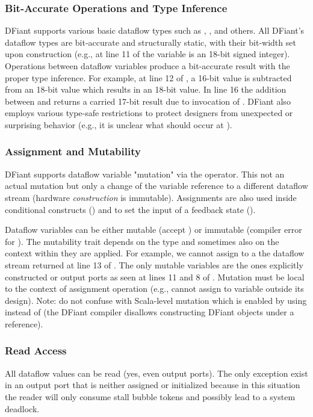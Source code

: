 \subsubsection{Bit-Accurate Operations and Type Inference}
DFiant supports various basic dataflow types such as , , and others.
All DFiant's dataflow types are bit-accurate and structurally static, with their bit-width set upon construction (e.g., at line 11 of  the variable  is an 18-bit signed integer). Operations between dataflow variables produce a bit-accurate result with the proper type inference. For example, at line 12 of , a 16-bit value is subtracted from an 18-bit value which results in an 18-bit value. In line 16 the addition between  and  returns a carried 17-bit result due to invocation of . DFiant also employs various type-safe restrictions to protect designers from unexpected or surprising behavior (e.g., it is unclear what should occur at ).

\subsubsection{Assignment and Mutability}
\label{sec:mutability}
DFiant supports dataflow variable "mutation" via the \code{:=} operator. This not an actual mutation but only a change of the variable reference to a different dataflow stream (hardware \emph{construction} is immutable). Assignments are also used inside conditional constructs () and to set the input of a feedback state ().

Dataflow variables can be either mutable (accept \code{:=}) or immutable (compiler error for \code{:=}). The mutability trait depends on the type and sometimes also on the context within they are applied. For example, we cannot assign to a the dataflow stream returned at line 13 of . The only mutable variables are the ones explicitly constructed or output ports as seen at lines 11 and 8 of . Mutation must be local to the context of assignment operation (e.g., cannot assign to variable outside its design).
Note: do not confuse with Scala-level mutation which is enabled by using  instead of  (the DFiant compiler disallows constructing DFiant objects under a  reference). 

\subsubsection{Read Access}
All dataflow values can be read (yes, even output ports). The only exception exist in an output port that is neither assigned or initialized because in this situation the reader will only consume stall bubble tokens and possibly lead to a system deadlock.

